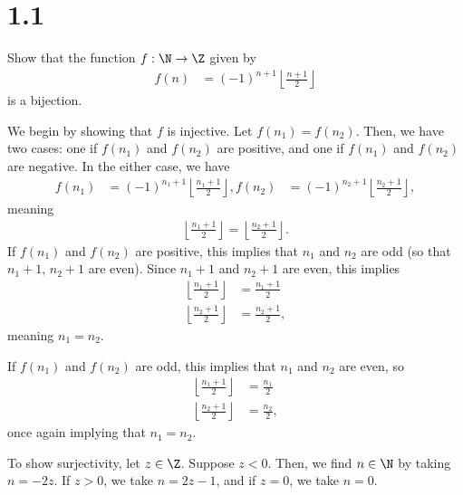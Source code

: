\documentclass[10pt]{mypackage}
\begin{document}
\section{1.1}%
\begin{problem}
  Show that the function $f: \N\rightarrow \Z$ given by
  \begin{align*}
    f(n) &= \left(-1\right)^{n+1}\left\lfloor \frac{n+1}{2}\right\rfloor
  \end{align*}
  is a bijection.
\end{problem}
\begin{solution}
  We begin by showing that $f$ is injective. Let $f\left(n_1\right) = f\left(n_2\right)$. Then, we have two cases: one if $f\left(n_1\right)$ and $f\left(n_2\right)$ are positive, and one if $f\left(n_1\right)$ and $f\left(n_2\right)$ are negative. In the either case, we have
  \begin{align*}
    f\left(n_1\right) &= \left(-1\right)^{n_1 + 1}\left\lfloor \frac{n_1 + 1}{2}\right\rfloor,
    f\left(n_2\right) &= \left(-1\right)^{n_2 + 1}\left\lfloor \frac{n_2 + 1}{2}\right\rfloor,
  \end{align*}
  meaning 
  \begin{align*}
    \left\lfloor \frac{n_1 + 1}{2}\right\rfloor = \left\lfloor \frac{n_2 + 1}{2}\right\rfloor.
  \end{align*}
  If $f\left(n_1\right)$ and $f\left(n_2\right)$ are positive, this implies that $n_1$ and $n_2$ are odd (so that $n_1 + 1$, $ n_2+ 1$ are even). Since $n_1 + 1$ and $n_2 + 1$ are even, this implies
  \begin{align*}
    \left\lfloor\frac{n_1 + 1}{2}\right\rfloor &= \frac{n_1 + 1}{2}\\
    \left\lfloor \frac{n_2 + 1}{2}\right\rfloor &= \frac{n_2 + 1}{2},
  \end{align*}
  meaning $n_1 = n_2$.\newline

  If $f\left(n_1\right)$ and $f\left(n_2\right)$ are odd, this implies that $n_1$ and $n_2$ are even, so
  \begin{align*}
    \left\lfloor\frac{n_1 + 1}{2}\right\rfloor &= \frac{n_1 }{2}\\
    \left\lfloor \frac{n_2 + 1}{2}\right\rfloor &= \frac{n_2 }{2},
  \end{align*}
  once again implying that $n_1 = n_2$.\newline

  To show surjectivity, let $z\in \Z$. Suppose $z < 0$. Then, we find $n\in \N$ by taking $n = -2z$. If $z > 0$, we take $n = 2z - 1$, and if $z = 0$, we take $n = 0$.
\end{solution}
\end{document}
